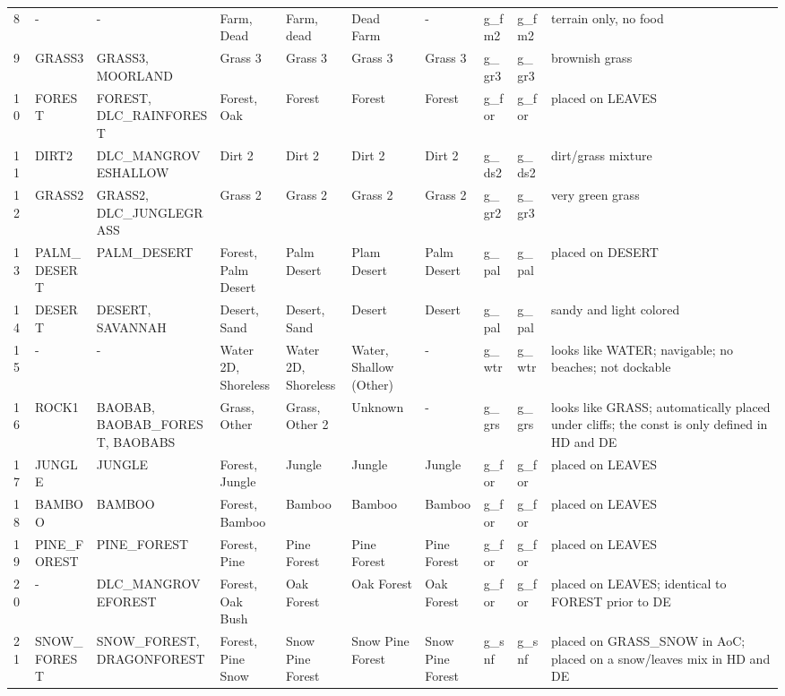 \begin{landscape}
\begin{longtable}{@{}p{5mm}|p{25mm}p{23mm}|p{14mm}p{14mm}p{14mm}p{14mm}|p{10mm}p{15mm}|p{45mm}@{}}
            8	& -	& -	& Farm, Dead	& Farm, dead	& Dead Farm	& -	& g\_fm2	& g\_fm2		& terrain only, no food \\
            9	& GRASS3	& GRASS3, MOORLAND	& Grass 3	& Grass 3	& Grass 3	& Grass 3	& g\_gr3	& g\_gr3		& brownish grass \\
            10	& FOREST	& FOREST, DLC\_RAINFOREST	& Forest, Oak	& Forest	& Forest	& Forest	& g\_for	& g\_for		& placed on LEAVES \\
            11	& DIRT2	& DLC\_MANGROVESHALLOW	& Dirt 2	& Dirt 2	& Dirt 2	& Dirt 2	& g\_ds2	& g\_ds2		& dirt/grass mixture \\
            12	& GRASS2	& GRASS2, DLC\_JUNGLEGRASS	& Grass 2	& Grass 2	& Grass 2	& Grass 2	& g\_gr2	& g\_gr3		& very green grass \\
            13	& PALM\_DESERT	& PALM\_DESERT	& Forest, Palm Desert	& Palm Desert	& Plam Desert	& Palm Desert	& g\_pal	& g\_pal		& placed on DESERT \\
            14	& DESERT	& DESERT, SAVANNAH	& Desert, Sand	& Desert, Sand	& Desert	& Desert	& g\_pal	& g\_pal		& sandy and light colored \\
            15	& -	& -	& Water 2D, Shoreless	& Water 2D, Shoreless	& Water, Shallow (Other)	& -	& g\_wtr	& g\_wtr		& looks like WATER; navigable; no beaches; not dockable \\
            16	& ROCK1	& BAOBAB, BAOBAB\_FOREST, BAOBABS	& Grass, Other	& Grass, Other 2	& Unknown	& -	& g\_grs	& g\_grs		& looks like GRASS; automatically placed under cliffs; the const is only defined in HD and DE \\
            17	& JUNGLE	& JUNGLE	& Forest, Jungle	& Jungle	& Jungle	& Jungle	& g\_for	& g\_for		& placed on LEAVES \\
            18	& BAMBOO	& BAMBOO	& Forest, Bamboo	& Bamboo	& Bamboo	& Bamboo	& g\_for	& g\_for		& placed on LEAVES \\
            19	& PINE\_FOREST	& PINE\_FOREST	& Forest, Pine	& Pine Forest	& Pine Forest	& Pine Forest	& g\_for	& g\_for		& placed on LEAVES \\
            20	& -	& DLC\_MANGROVEFOREST	& Forest, Oak Bush	& Oak Forest	& Oak Forest	& Oak Forest	& g\_for	& g\_for		& placed on LEAVES; identical to FOREST prior to DE \\
            21	& SNOW\_FOREST	& SNOW\_FOREST, DRAGONFOREST	& Forest, Pine Snow	& Snow Pine Forest	& Snow Pine Forest	& Snow Pine Forest	& g\_snf	& g\_snf		& placed on GRASS\_SNOW in AoC; placed on a snow/leaves mix in HD and DE \\

\end{longtable}
\end{landscape}
